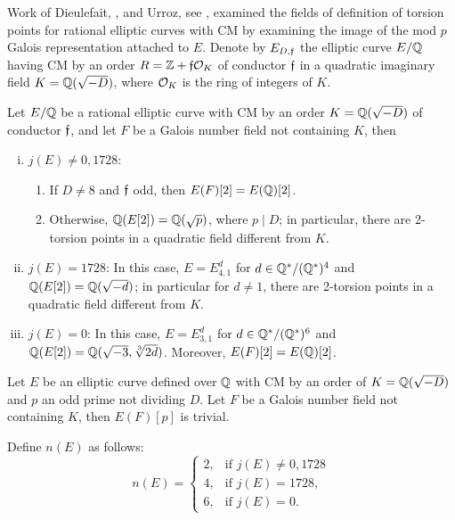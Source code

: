 Work of Dieulefait, \gonjim{}, and Urroz, see \cite{dieulefaitgonjimurroz11}, examined the fields of definition of torsion points for rational elliptic curves with CM by examining the image of the mod $p$ Galois representation attached to $E$. Denote by $E_{D,\mathfrak{f}}$ the elliptic curve $E/\mathbb{Q}$ having CM by an order $R= \mathbb{Z} + \mathfrak{f} \mathcal{O}_K$ of conductor $\mathfrak{f}$ in a quadratic imaginary field $K= \mathbb{Q}(\sqrt{-D})$, where $\mathcal{O}_K$ is the ring of integers of $K$.


\begin{thm}
Let $E/\mathbb{Q}$ be a rational elliptic curve with CM by an order $K= \mathbb{Q}(\sqrt{-D})$ of conductor $\mathfrak{f}$, and let $F$ be a Galois number field not containing $K$, then
	\begin{enumerate}[(i)]
	\item $j(E) \neq 0, 1728$:
		\begin{enumerate}[--]
		\item If $D \neq 8$ and $\mathfrak{f}$ odd, then $E(F)[2]= E(\mathbb{Q})[2]$.
		\item Otherwise, $\mathbb{Q}(E[2])= \mathbb{Q}(\sqrt{p})$, where $p \mid D$; in particular, there are 2-torsion points in a quadratic field different from $K$.
		\end{enumerate}
	\item $j(E)= 1728$: In this case, $E= E_{4,1}^d$ for $d \in \mathbb{Q}^*/(\mathbb{Q}^*)^4$ and $\mathbb{Q}(E[2])= \mathbb{Q}(\sqrt{-d})$; in particular for $d \neq 1$, there are 2-torsion points in a quadratic field different from $K$.
	\item $j(E)= 0$: In this case, $E= E_{3,1}^d$ for $d \in \mathbb{Q}^*/(\mathbb{Q}^*)^6$ and $\mathbb{Q}(E[2])= \mathbb{Q}(\sqrt{-3}, \sqrt[3]{2d})$. Moreover, $E(F)[2]= E(\mathbb{Q})[2]$. 
	\end{enumerate}
\end{thm}


\begin{thm}
Let $E$ be an elliptic curve defined over $\mathbb{Q}$ with CM by an order of $K= \mathbb{Q}(\sqrt{-D})$ and $p$ an odd prime not dividing $D$. Let $F$ be a Galois number field not containing $K$, then $E(F)[p]$ is trivial. 
\end{thm}


Define $n(E)$ as follows:
	\[
	n(E)=
	\begin{cases}
	2, & \text{if } j(E) \neq 0, 1728 \\
	4, & \text{if } j(E)= 1728, \\
	6, & \text{if } j(E)= 0.	
	\end{cases}
	\]

